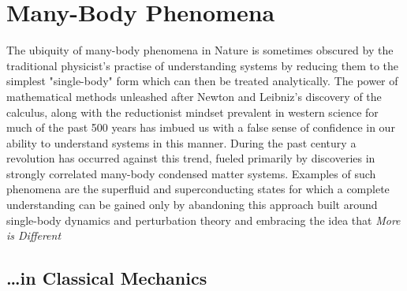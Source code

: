\section{Many-Body Phenomena}

The ubiquity of many-body phenomena in Nature is sometimes obscured by the traditional physicist's practise of understanding systems  by reducing them to the simplest "single-body" form which can then be treated analytically. The power of mathematical methods unleashed after Newton and Leibniz's discovery of the calculus, along with the reductionist mindset prevalent in western science for much of the past 500 years has imbued us with a false sense of confidence in our ability to understand systems in this manner. During the past century a revolution has occurred against this trend, fueled primarily by discoveries in strongly correlated many-body condensed matter systems. Examples of such phenomena are the superfluid and superconducting states for which a complete understanding can be gained only by abandoning this approach built around single-body dynamics and perturbation theory and embracing the idea that \emph{More is Different}\cite{Anderson1972More}

\subsection{\dots in Classical Mechanics}